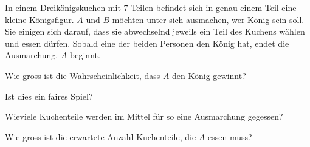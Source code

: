 In einem Dreikönigskuchen mit 7 Teilen befindet sich in genau einem
Teil eine kleine Königsfigur.
$A$ und $B$ möchten unter sich ausmachen, wer König sein soll.
Sie einigen sich darauf, dass sie abwechselnd jeweils ein Teil
des Kuchens wählen und essen dürfen.
Sobald eine der beiden Personen den König hat, endet die Ausmarchung.
$A$ beginnt.
\begin{teilaufgaben}
\item
Wie gross ist die Wahrscheinlichkeit, dass $A$ den König gewinnt?
\item
Ist dies ein faires Spiel?
\item
Wieviele Kuchenteile werden im Mittel für so eine Ausmarchung gegessen?
\item
Wie gross ist die erwartete Anzahl Kuchenteile, die $A$ essen muss?
\end{teilaufgaben}

